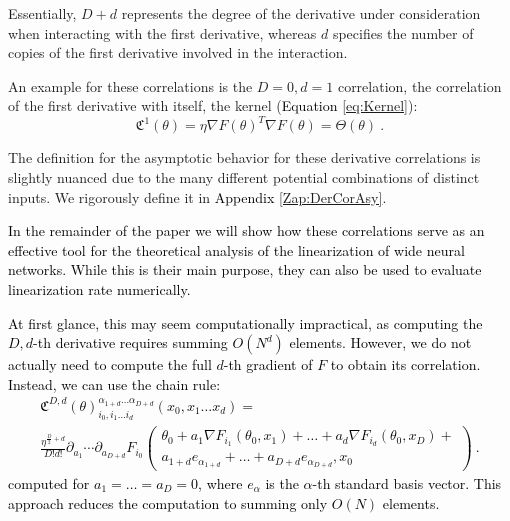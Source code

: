 \documentclass{article} %
\begin{document}
Essentially, $D+d$ represents the degree of the derivative under consideration when interacting with the first derivative, whereas $d$ specifies the number of copies of the first derivative involved in the interaction. 

An example for these correlations is the \(D=0,d=1\) correlation, the correlation of the first derivative with itself, the kernel (\textcolor{black}{Equation} \ref{eq:Kernel}): 
\begin{equation}
\mathfrak{C}^{1}\left(\theta\right)=\eta\nabla F\left(\theta\right)^{T}\nabla F\left(\theta\right) = \Theta\left(\theta\right) \ .
\end{equation}

The definition for the asymptotic behavior for these derivative correlations is slightly nuanced due to the many different potential combinations of distinct inputs. We rigorously define it in \textcolor{black}{Appendix} \ref{Zap:DerCorAsy}.

\textcolor{black}{
In the remainder of the paper we will show how these correlations serve as an effective tool for the theoretical analysis of the linearization of wide neural networks. While this is their main purpose, they can also be used \textcolor{black}{to} evaluate linearization rate numerically. }

\newpage

\textcolor{black}{At first glance, this may seem computationally impractical, as computing the $D,d$-th derivative requires summing $O\left(N^d\right)$ elements. However, we do not actually need to compute the full $d$-th gradient of $F$ to obtain its correlation. Instead, we can use the chain rule:
\begin{equation}
\begin{array}{c}
\mathfrak{C}^{D,d}\left(\theta\right)_{i_{0},i_{1}\ldots i_{d}}^{\alpha_{1+d}\ldots\alpha_{D+d}}\left(x_{0},x_{1}\ldots x_{d}\right)=\\
\frac{\eta^{\frac{D}{2}+d}}{D!d!}\partial_{a_{1}}\cdots\partial_{a_{D+d}}F_{i_{0}}\left(\begin{array}{c}
\theta_{0}+a_{1}\nabla F_{i_{1}}\left(\theta_{0},x_{1}\right)+\ldots+a_{d}\nabla F_{i_{d}}\left(\theta_{0},x_{D}\right)+\\
a_{1+d}e_{\alpha_{1+d}}+\ldots+a_{D+d}e_{\alpha_{D+d}},x_{0}
\end{array}\right)\ .
\end{array}
\end{equation}
computed for $a_{1}=\ldots=a_{D}=0$,
where $e_\alpha$ is the
$\alpha$-th standard basis vector. This approach reduces the computation to summing only $O\left(N\right)$ elements.
}
\end{document}
